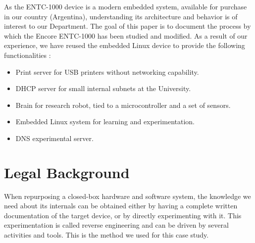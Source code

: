 \documentclass[conference]{IEEEtran}
\newcommand{\nota}[1]{}
\begin{document}
\nota{Es de interés para nuestra facultad el entendimiento de la arquitectura y funcionamiento
de los dispositivos ENTC-1000,
ya que se trata de un sistema embebido moderno, y disponible
para su adquisición en el país. Conocer su funcionamiento interno
nos permite la experimentación académica con Linux embebido. Y,
por último, pero no menos importante, permite su reuso para necesidades
específicas en el marco de los sistemas embebidos.
}

As the ENTC-1000 device is a modern embedded system, available for purchase in
our country (Argentina), understanding its architecture and behavior is of interest to our Department.  
The goal of this paper is to document the process by which the Encore ENTC-1000
has been studied and modified. As a result of our experience,
we have reused the embedded Linux device to provide the following functionalities :

\begin{itemize}
\item Print server for USB printers without networking capability. 
\item DHCP server for small internal subnets at the University. 
\item Brain for research robot, tied to a microcontroller and a set of sensors. 
\item Embedded Linux system for learning and experimentation.  
\item DNS experimental server.  
\end{itemize}


\section{Legal Background}

\nota{ Marco Jurídico }

\nota{Cuando reutilizamos un sistema embebido de hardware y software cerrado, necesitamos la
documentación completa de las especificaciones del dispositivo.
Si esa documentación no existe, o si no existe
completamente, es necesario descubrir su funcionamiento mediante
diferentes pruebas. Este último método es el elegido en este artículo, y es lo que 
se denomina ingeniería inversa.}

When repurposing a closed-box hardware and software system, the knowledge we need about its internals can be obtained either by having a complete written documentation of the target device, or by directly experimenting with it. This experimentation is called reverse engineering and can be driven by several activities and tools. This is the method we used for this case study.
\end{document}

